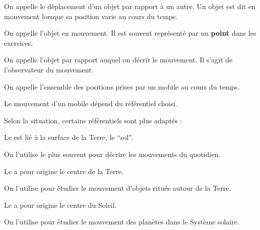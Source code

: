 \documentclass[11pt,a4paper]{article}
\begin{document}
\pagination



On appelle  le déplacement d’un objet par rapport à un autre. Un objet est dit en mouvement lorsque sa position varie au cours du temps.

On appelle  l’objet en mouvement. Il est souvent représenté par un \textbf{point} dans les exercices.

On appelle  l’objet par rapport auquel on décrit le mouvement. Il s’agit de l’observateur du mouvement.

On appelle  l’ensemble des positions prises par un mobile au cours du temps.


Le mouvement d’un mobile dépend du référentiel choisi.


Selon la situation, certains référentiels sont plus adaptés :


Le  est lié à la surface de la Terre, le “sol”.

On l’utilise le plus souvent pour décrire les mouvements du quotidien.



Le  a pour origine le centre de la Terre.

On l’utilise pour étudier le mouvement d’objets situés autour de la Terre.



Le  a pour origine le centre du Soleil.

On l’utilise pour étudier le mouvement des planètes dans le Système solaire.


\end{document}

